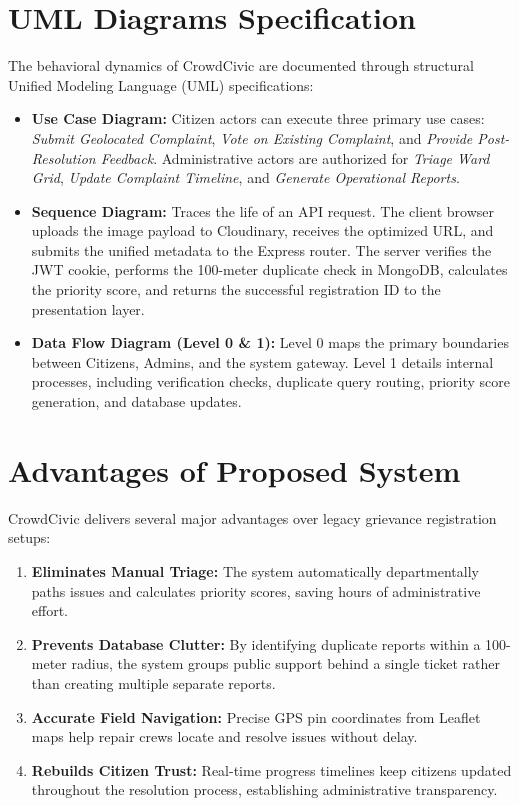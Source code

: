 \documentclass[conference]{IEEEtran}
\begin{document}
\section{UML Diagrams Specification}
The behavioral dynamics of CrowdCivic are documented through structural Unified Modeling Language (UML) specifications:
\begin{itemize}
    \item \textbf{Use Case Diagram:} Citizen actors can execute three primary use cases: \textit{Submit Geolocated Complaint}, \textit{Vote on Existing Complaint}, and \textit{Provide Post-Resolution Feedback}. Administrative actors are authorized for \textit{Triage Ward Grid}, \textit{Update Complaint Timeline}, and \textit{Generate Operational Reports}.
    \item \textbf{Sequence Diagram:} Traces the life of an API request. The client browser uploads the image payload to Cloudinary, receives the optimized URL, and submits the unified metadata to the Express router. The server verifies the JWT cookie, performs the 100-meter duplicate check in MongoDB, calculates the priority score, and returns the successful registration ID to the presentation layer.
    \item \textbf{Data Flow Diagram (Level 0 \& 1):} Level 0 maps the primary boundaries between Citizens, Admins, and the system gateway. Level 1 details internal processes, including verification checks, duplicate query routing, priority score generation, and database updates.
\end{itemize}

\section{Advantages of Proposed System}
CrowdCivic delivers several major advantages over legacy grievance registration setups:
\begin{enumerate}
    \item \textbf{Eliminates Manual Triage:} The system automatically departmentally paths issues and calculates priority scores, saving hours of administrative effort.
    \item \textbf{Prevents Database Clutter:} By identifying duplicate reports within a 100-meter radius, the system groups public support behind a single ticket rather than creating multiple separate reports.
    \item \textbf{Accurate Field Navigation:} Precise GPS pin coordinates from Leaflet maps help repair crews locate and resolve issues without delay.
    \item \textbf{Rebuilds Citizen Trust:} Real-time progress timelines keep citizens updated throughout the resolution process, establishing administrative transparency.
\end{enumerate}
\end{document}

